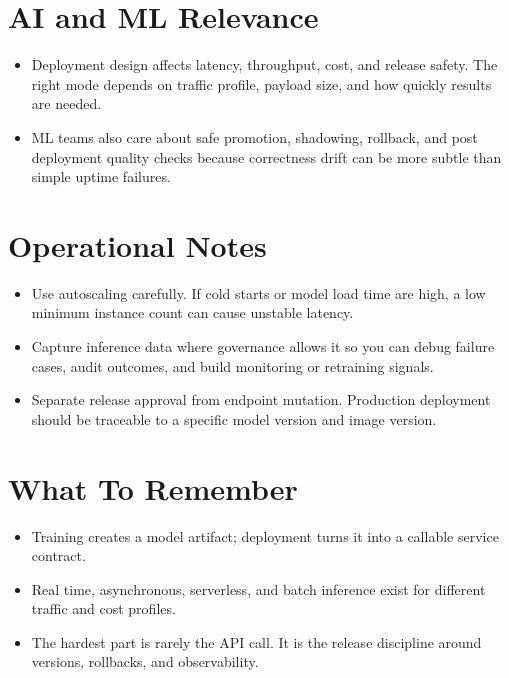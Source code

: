 \documentclass[10pt,twocolumn]{article}
\begin{document}
\section*{AI and ML Relevance}
\begin{itemize}
\item Deployment design affects latency, throughput, cost, and release safety. The right mode depends on traffic profile, payload size, and how quickly results are needed.
\item ML teams also care about safe promotion, shadowing, rollback, and post deployment quality checks because correctness drift can be more subtle than simple uptime failures.
\end{itemize}

\section*{Operational Notes}
\begin{itemize}
\item Use autoscaling carefully. If cold starts or model load time are high, a low minimum instance count can cause unstable latency.
\item Capture inference data where governance allows it so you can debug failure cases, audit outcomes, and build monitoring or retraining signals.
\item Separate release approval from endpoint mutation. Production deployment should be traceable to a specific model version and image version.
\end{itemize}

\section*{What To Remember}
\begin{itemize}
\item Training creates a model artifact; deployment turns it into a callable service contract.
\item Real time, asynchronous, serverless, and batch inference exist for different traffic and cost profiles.
\item The hardest part is rarely the API call. It is the release discipline around versions, rollbacks, and observability.
\end{itemize}
\end{document}
